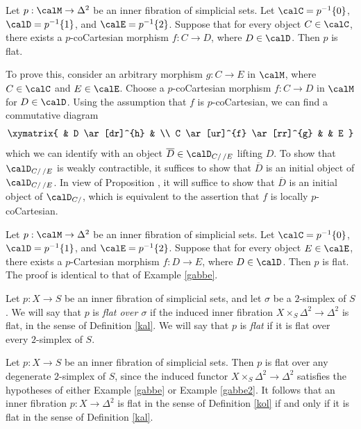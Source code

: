 \begin{example}\label{gabbe}
Let $p: \calM \rightarrow \Delta^2$ be an inner fibration of simplicial sets.
Let $\calC = p^{-1} \{0\}$, $\calD = p^{-1} \{1\}$, and $\calE = p^{-1} \{2\}$.
Suppose that for every object $C \in \calC$, there exists a $p$-coCartesian
morphism $f: C \rightarrow D$, where $D \in \calD$. Then $p$ is flat.

To prove this, consider an arbitrary morphism $g: C \rightarrow E$ in
$\calM$, where $C \in \calC$ and $E \in \calE$. Choose a $p$-coCartesian morphism
$f: C \rightarrow D$ in $\calM$ for $D \in \calD$. Using the assumption that
$f$ is $p$-coCartesian, we can find a commutative diagram
$$ \xymatrix{ & D \ar[dr]^{h} & \\
C \ar[ur]^{f} \ar[rr]^{g} & & E }$$
which we can identify with an object $\overline{D} \in \calD_{C/ \, /E}$ lifting
$D$. To show that $\calD_{C/ \, /E}$ is weakly contractible, it suffices to show that
$\overline{D}$ is an initial object of $\calD_{C/ \, /E}$. In view of Proposition
, it will suffice to show that $\overline{D}$ is an initial object of
$\calD_{C/}$, which is equivalent to the assertion that $f$ is locally $p$-coCartesian.
\end{example}

\begin{example}\label{gabbe2}
Let $p: \calM \rightarrow \Delta^2$ be an inner fibration of simplicial sets.
Let $\calC = p^{-1} \{0\}$, $\calD = p^{-1} \{1\}$, and $\calE = p^{-1} \{2\}$.
Suppose that for every object $E \in \calE$, there exists a $p$-Cartesian
morphism $f: D \rightarrow E$, where $D \in \calD$. Then $p$ is flat. The proof
is identical to that of Example \ref{gabbe}.
\end{example}

\begin{definition}\label{kol}
Let $p: X \rightarrow S$ be an inner fibration of simplicial sets, and let
$\sigma$ be a $2$-simplex of $S$. We will say that $p$ is {\it flat over $\sigma$} if
the induced inner fibration $X \times_{S} \Delta^2 \rightarrow \Delta^2$ is flat, in the sense of Definition \ref{kal}. We will say that $p$ is {\it flat} if it is flat over every $2$-simplex of $S$.
\end{definition}

\begin{example}
Let $p: X \rightarrow S$ be an inner fibration of simplicial sets. Then $p$ is flat over
any degenerate $2$-simplex of $S$, since the induced functor $X \times_{ S} \Delta^2 \rightarrow \Delta^2$ satisfies the hypotheses of either Example \ref{gabbe} or Example \ref{gabbe2}.
It follows that an inner fibration $p: X \rightarrow \Delta^2$ is flat in the sense of
Definition \ref{kol} if and only if it is flat in the sense of Definition \ref{kal}.
\end{example}

